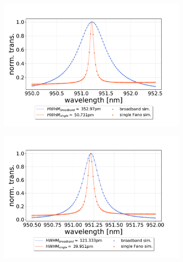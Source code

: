 \begin{figure}[h!]
    \centering
    \begin{subfigure}[b]{0.49\textwidth}
        \includegraphics[width=\textwidth]{figures/sim_single_vs_broadband_10um.pdf}
        \caption{}
        \label{fig:single_vs_broadband_simulation_10um}
    \end{subfigure}
    \begin{subfigure}[b]{0.49\textwidth}
        \includegraphics[width=\textwidth]{figures/sim_single_vs_broadband_30um.pdf}
        \caption{}
        \label{fig:single_vs_broadband_simulation_30um}
    \end{subfigure}
    \begin{subfigure}[b]{0.49\textwidth}

\end{subfigure}
\end{figure}
